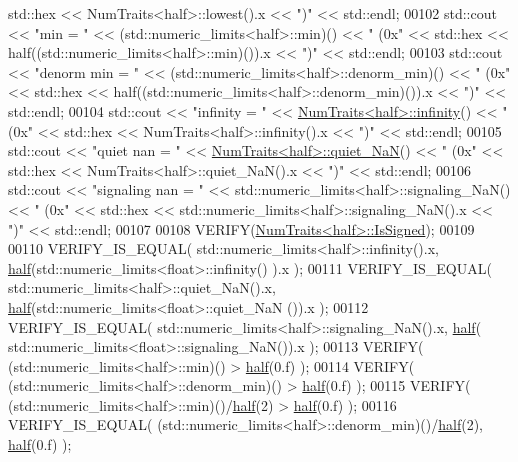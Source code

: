 \begin{DoxyCode}
      std::hex << NumTraits<half>::lowest().x << \textcolor{stringliteral}{")"} << std::endl;
00102   std::cout << \textcolor{stringliteral}{"min           = "} << (std::numeric\_limits<half>::min)() << \textcolor{stringliteral}{"  (0x"} << std::hex <<
       half((std::numeric\_limits<half>::min)()).x << \textcolor{stringliteral}{")"} << std::endl;
00103   std::cout << \textcolor{stringliteral}{"denorm min    = "} << (std::numeric\_limits<half>::denorm\_min)() << \textcolor{stringliteral}{"  (0x"} << std::hex <<
       half((std::numeric\_limits<half>::denorm\_min)()).x << \textcolor{stringliteral}{")"} << std::endl;
00104   std::cout << \textcolor{stringliteral}{"infinity      = "} << \hyperlink{group___core___module_struct_eigen_1_1_num_traits}{NumTraits<half>::infinity}() << \textcolor{stringliteral}{"  (0x"} << 
      std::hex << NumTraits<half>::infinity().x << \textcolor{stringliteral}{")"} << std::endl;
00105   std::cout << \textcolor{stringliteral}{"quiet nan     = "} << \hyperlink{group___core___module_struct_eigen_1_1_num_traits}{NumTraits<half>::quiet\_NaN}() << \textcolor{stringliteral}{"  (0x"} << 
      std::hex << NumTraits<half>::quiet\_NaN().x << \textcolor{stringliteral}{")"} << std::endl;
00106   std::cout << \textcolor{stringliteral}{"signaling nan = "} << std::numeric\_limits<half>::signaling\_NaN() << \textcolor{stringliteral}{"  (0x"} << std::hex <<
       std::numeric\_limits<half>::signaling\_NaN().x << \textcolor{stringliteral}{")"} << std::endl;
00107 
00108   VERIFY(\hyperlink{group___core___module_struct_eigen_1_1_num_traits}{NumTraits<half>::IsSigned});
00109 
00110   VERIFY\_IS\_EQUAL( std::numeric\_limits<half>::infinity().x, \hyperlink{struct_eigen_1_1half}{half}(std::numeric\_limits<float>::infinity()
      ).x );
00111   VERIFY\_IS\_EQUAL( std::numeric\_limits<half>::quiet\_NaN().x, \hyperlink{struct_eigen_1_1half}{half}(std::numeric\_limits<float>::quiet\_NaN
      ()).x );
00112   VERIFY\_IS\_EQUAL( std::numeric\_limits<half>::signaling\_NaN().x, \hyperlink{struct_eigen_1_1half}{half}(
      std::numeric\_limits<float>::signaling\_NaN()).x );
00113   VERIFY( (std::numeric\_limits<half>::min)() > \hyperlink{struct_eigen_1_1half}{half}(0.f) );
00114   VERIFY( (std::numeric\_limits<half>::denorm\_min)() > \hyperlink{struct_eigen_1_1half}{half}(0.f) );
00115   VERIFY( (std::numeric\_limits<half>::min)()/\hyperlink{struct_eigen_1_1half}{half}(2) > \hyperlink{struct_eigen_1_1half}{half}(0.f) );
00116   VERIFY\_IS\_EQUAL( (std::numeric\_limits<half>::denorm\_min)()/\hyperlink{struct_eigen_1_1half}{half}(2), \hyperlink{struct_eigen_1_1half}{half}(0.f) );

\end{DoxyCode}
